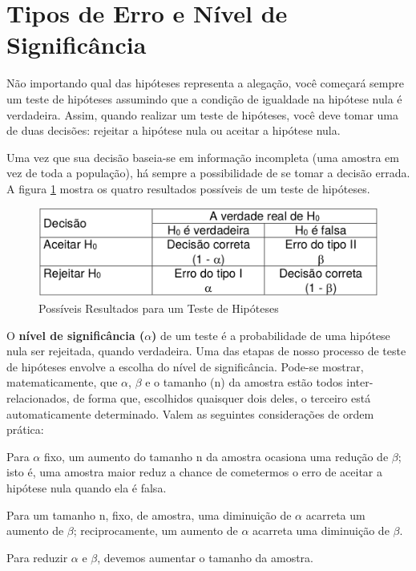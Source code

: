\section{Tipos de Erro e Nível de Significância}

Não importando qual das hipóteses representa a alegação, você começará sempre um teste de hipóteses assumindo que a condição de igualdade na hipótese nula é verdadeira. Assim, quando realizar um teste de hipóteses, você deve tomar uma de duas decisões: rejeitar a hipótese nula ou aceitar a hipótese nula.

Uma vez que sua decisão baseia-se em informação incompleta (uma amostra em vez de toda a população), há sempre a possibilidade de se tomar a decisão errada. A figura \ref{fig:resultados-teste-hipoteses} mostra os quatro resultados possíveis de um teste de hipóteses.

\begin{figure}[h]
	\center
	\caption{Possíveis Resultados para um Teste de Hipóteses}	
	\label{fig:resultados-teste-hipoteses}
	\includegraphics[scale=1.7]{testes-hipoteses/resultados-teste-hipoteses.png}
\end{figure}

O \textbf{nível de significância (\(\alpha\))} de um teste é a probabilidade de uma hipótese nula ser rejeitada, quando verdadeira. Uma das etapas de nosso processo de teste de hipóteses envolve a escolha do nível de significância. Pode-se mostrar, matematicamente, que \(\alpha\), \(\beta\) e o tamanho (n) da amostra estão todos inter-relacionados, de forma que, escolhidos quaisquer dois deles, o terceiro está
automaticamente determinado. Valem as seguintes considerações de ordem prática:
\begin{alineas}
\item Para \(\alpha\) fixo, um aumento do tamanho n da amostra ocasiona uma redução
de \(\beta\); isto é, uma amostra maior reduz a chance de cometermos o erro de aceitar a hipótese nula quando ela é falsa.
\item Para um tamanho n, fixo, de amostra, uma diminuição de \(\alpha\) acarreta um aumento de \(\beta\); reciprocamente, um aumento de \(\alpha\) acarreta uma diminuição de \(\beta\).
\item Para reduzir \(\alpha\) e \(\beta\), devemos aumentar o tamanho da amostra.
\end{alineas}

